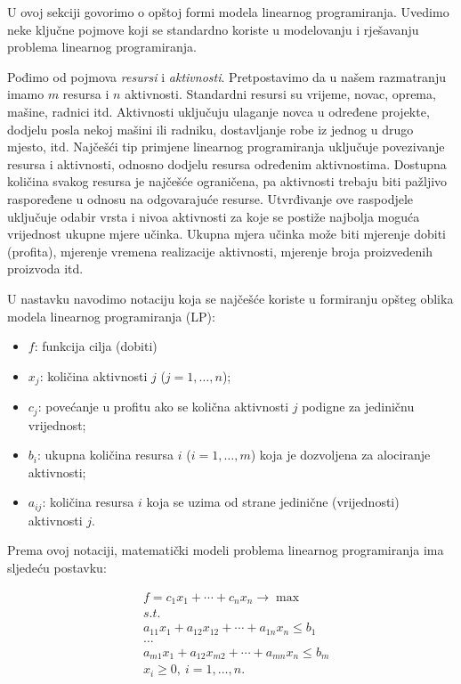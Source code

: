\documentclass[a4paper, utf8, 11pt, colorlinks]{book}
\begin{document}
U ovoj sekciji govorimo o opštoj formi modela linearnog programiranja. Uvedimo neke ključne pojmove koji se standardno koriste u modelovanju i rješavanju problema linearnog programiranja. 

Pođimo od pojmova \textit{resursi} i \textit{aktivnosti}. Pretpostavimo da u našem razmatranju imamo $m$ resursa i $n$ aktivnosti. Standardni resursi su vrijeme, novac, oprema, mašine, radnici itd. Aktivnosti uključuju ulaganje novca u određene projekte, dodjelu posla nekoj mašini ili radniku,  dostavljanje robe iz jednog u drugo mjesto, itd. 
 Najčešći tip primjene linearnog programiranja uključuje povezivanje resursa i aktivnosti, odnosno dodjelu resursa određenim aktivnostima. Dostupna količina svakog resursa je najčešće ograničena, pa aktivnosti trebaju biti pažljivo raspoređene u odnosu na odgovarajuće resurse.  Utvrđivanje ove raspodjele uključuje odabir vrsta i nivoa aktivnosti za koje se postiže najbolja moguća vrijednost ukupne mjere učinka. Ukupna mjera učinka može biti mjerenje dobiti (profita), mjerenje vremena realizacije aktivnosti, mjerenje broja proizvedenih proizvoda itd.

U nastavku navodimo notaciju koja se najčešće koriste u formiranju opšteg oblika modela linearnog programiranja (LP):

\begin{itemize}
    \item $f$: funkcija cilja (dobiti) 
    \item $x_j$: količina aktivnosti $j$ ($j = 1,\ldots,n$);
    \item $c_j$: povećanje u profitu ako se količna aktivnosti $j$ podigne za jediničnu vrijednost;
    \item $b_i$: ukupna količina resursa $i$ ($i=1,\ldots,m$) koja je dozvoljena za alociranje aktivnosti;
    \item $a_{ij}$: količina resursa $i$ koja se uzima od strane jedinične (vrijednosti) aktivnosti $j$.
\end{itemize}
Prema ovoj notaciji, matematički modeli problema linearnog programiranja ima sljedeću postavku:

\begin{align} 
      &f = c_1 x_1 + \cdots + c_n x_n \rightarrow \max \label{form:LP-1}\\
      & s.t. \nonumber \\
      & a_{11}x_1 + a_{12} x_{12} + \cdots + a_{1n}x_n \leq b_1 \label{form:LP-2} \\
      &\ldots \nonumber \\
      & a_{m1}x_1 + a_{12} x_{m2} + \cdots + a_{mn}x_n \leq b_m \label{form:LP-3} \\
      & x_i \geq 0,\ i=1,\ldots,n.\label{form:LP-4}
\end{align}
\end{document}

